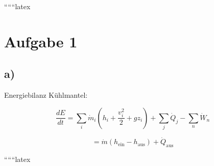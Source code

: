 
``````latex


\section*{Aufgabe 1}

\subsection*{a)}

Energiebilanz Kühlmantel:

\[
\frac{dE}{dt} = \sum_i \dot{m}_i \left( h_i + \frac{v_i^2}{2} + g z_i \right) + \sum_j \dot{Q}_j - \sum_n \dot{W}_n
\]

\[
= \dot{m} (h_{\text{ein}} - h_{\text{aus}}) + \dot{Q}_{\text{aus}}
\]

``````latex


